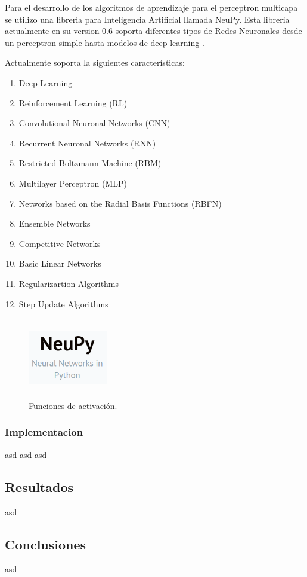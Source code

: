 \documentclass[12pt]{article}
\newcounter{subsubsubsection}[subsubsection]
\begin{document}
Para el desarrollo de los algoritmos de aprendizaje para el perceptron multicapa se utilizo una libreria para Inteligencia Artificial llamada NeuPy. Esta libreria actualmente en su version 0.6 soporta diferentes tipos de Redes Neuronales desde un perceptron simple hasta modelos de deep learning \cite{neupy}.

Actualmente soporta la siguientes características:

\begin{enumerate}
\item Deep Learning
\item Reinforcement Learning (RL)
\item Convolutional Neuronal Networks (CNN)
\item Recurrent Neuronal Networks (RNN)
\item Restricted Boltzmann Machine (RBM)
\item Multilayer Perceptron (MLP)
\item Networks based on the Radial Basis Functions (RBFN)
\item Ensemble Networks
\item Competitive Networks
\item Basic Linear Networks
\item Regularizartion Algorithms
\item Step Update Algorithms
\end{enumerate}

\begin{figure}[h]
\includegraphics[width=3.5cm, height=3.5cm]{neupy}
\centering
\caption{Funciones de activación.}
\label{fig:FUNCACT}
\end{figure}

\subsubsection{Implementacion}

asd
asd
asd

\subsection{Resultados}
asd
\subsection{Conclusiones}
asd




\end{document}
